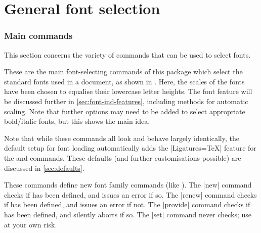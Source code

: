 \documentclass[a4paper]{l3doc}
\begin{document}
\part{General font selection}

\section{Main commands}
\label{sec:main-cmd}

This section concerns the variety of commands that can be used to select
fonts.

\bigskip
{}

These are the main font-selecting commands of this package which select the standard fonts used in a document, as shown in .
Here, the scales of the fonts have been chosen to equalise their
lowercase letter heights. The  font feature will be discussed
further in \vref{sec:font-ind-features}, including methods for automatic
scaling.
Note that further options may need to be added to select appropriate bold/italic fonts,
but this shows the main idea.

Note that while these commands all look and behave largely identically, the default setup for font loading automatically adds the |Ligatures=TeX| feature for the  and  commands.
These defaults (and further customisations possible) are discussed in \vref{sec:defaults}.

\bigskip
{}

These commands define new font family commands (like ).
The |new| command checks if  has been defined, and issues an error if so.
The |renew| command checks if  has been defined, and issues an error if not.
The |provide| command checks if  has been defined, and silently aborts if so.
The |set| command never checks; use at your own risk.
\end{document}
